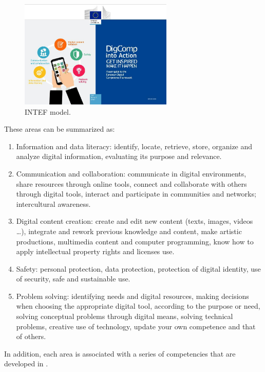 \documentclass{textolivre}
\begin{document}
\begin{figure}[htbp]
 \centering
 \includegraphics[width=0.65\textwidth]{fig03.jpg}
 \caption{INTEF model.}
 \label{fig03}
\end{figure}


These areas can be summarized as:
\begin{enumerate}
\item Information and data literacy: identify, locate, retrieve, store, organize and analyze digital information, evaluating its purpose and relevance.
\item Communication and collaboration: communicate in digital environments,
share resources through online tools, connect and collaborate with others
through digital tools, interact and participate in communities and networks;
intercultural awareness.
\item Digital content creation: create and edit new content (texts, images,
videos \ldots), integrate and rework previous knowledge and content, make
artistic productions, multimedia content and computer programming, know how to
apply intellectual property rights and licenses use.
\item Safety: personal protection, data protection, protection of digital
identity, use of security, safe and sustainable use.
\item Problem solving: identifying needs and digital resources, making
decisions when choosing the appropriate digital tool, according to the purpose
or need, solving conceptual problems through digital means, solving technical
problems, creative use of technology, update your own competence and that of
others.
\end{enumerate}

In addition, each area is associated with a series of competencies that are developed in .
\end{document}
